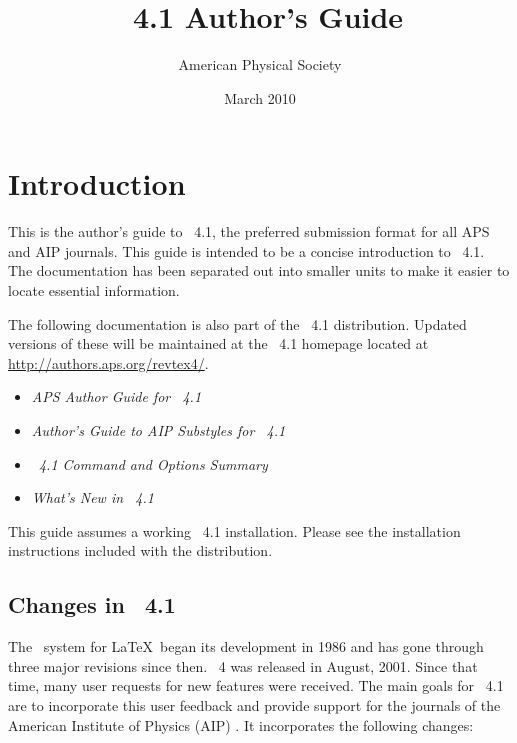 \documentclass[%
,aps%
 ,twocolumn%
 ,secnumarabic%
,amssymb, amsmath,nobibnotes, aps, prl, floatfix]{revtex4-1}
\begin{document}
\title{\revtex~4.1 Author's Guide}%
\author{American Physical Society}%
\date{March 2010}%
\maketitle
\tableofcontents
\clearpage
\section{Introduction}

This is the author's guide to \revtex~4.1, the preferred submission
format for all APS and AIP journals. This guide is intended to be a concise
introduction to \revtex~4.1. The documentation has been separated out
into smaller units to make it easier to locate essential
information.

The following documentation is also part of the \revtex~4.1
distribution. Updated versions of these will be maintained at
the \revtex~4.1 homepage located at \url{http://authors.aps.org/revtex4/}.
\begin{itemize}
\item \textit{APS Author Guide for \revtex~4.1}
\item \textit{Author's Guide to AIP Substyles for \revtex~4.1}
\item \textit{\revtex~4.1 Command and Options Summary}
\item \textit{What's New in  \revtex~4.1}
\end{itemize}
This guide assumes a working \revtex~4.1
installation. Please see the installation instructions included with the
distribution.
\subsection{Changes in \revtex~4.1}
The \revtex\ system for \LaTeX\ began its development in 1986 and has
gone through three major revisions since then.  \revtex~4 was released in August, 2001. Since that time,
many user requests for new features were received. The main goals for  \revtex~4.1 are to incorporate
this user feedback and provide support for the journals of the American Institute of Physics (AIP) . It incorporates the following changes:
\end{document}
